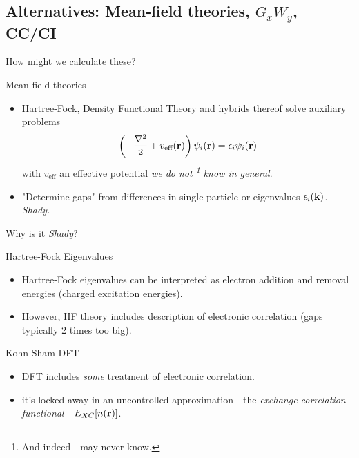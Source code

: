 \documentclass[12pt, pdf, hyperref={draft}, usenames, dvipsnames]{beamer}
\newcommand{\red}[1]{{\bf\color{LancsRed}{#1}}}
\begin{document}

\subsection{Alternatives: Mean-field theories, $G_{x}W_{y}$, CC/CI}

\begin{frame}{How might we calculate these?}

  \begin{block}{Mean-field theories}
    \begin{itemize}
    \item Hartree-Fock, Density Functional Theory and hybrids thereof solve
    auxiliary problems
    \begin{equation}
    \left(-\dfrac{\nabla^2}{2} + v_{\text{eff}}({\bf r})\right) \psi_i({\bf r})
    = \epsilon_i \psi_i({\bf r})
    \end{equation}
    with $v_{\text{eff}}$ an effective potential {\it we do not
    \footnote{And indeed - may never know.} know in general}.
    \item "Determine gaps" from differences in single-particle \red{Kohn-Sham}
    or \red{Hartree-Fock} eigenvalues
    $\epsilon_i({\bf k})$. {\it \color{Gray}Shady.}

    \end{itemize}
  \end{block}

\end{frame}

\begin{frame}{Why is it {\it \color{Gray}Shady}?}
\begin{block}{Hartree-Fock Eigenvalues}
\begin{itemize}
  \item Hartree-Fock eigenvalues can be interpreted as electron addition
  and removal energies (charged excitation energies).
  \item However, HF theory includes \red{absolutely no} description of
  electronic correlation (gaps typically 2 times too big).
\end{itemize}
\end{block}
\begin{block}{Kohn-Sham DFT}
\begin{itemize}
  \item DFT includes {\it some} treatment of electronic correlation.
  \item \red{BUT} it's locked away in an uncontrolled approximation - the {\it
  exchange-correlation functional} - $E_{XC}[n({\bf r})]$.
\end{itemize}
\end{block}
\end{frame}
\end{document}
